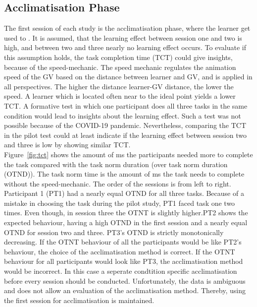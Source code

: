 \subsection{Acclimatisation Phase}
The first session of each study is the acclimatisation phase, where the learner get used to \exgo. It is assumed, that the learning effect between session one and two is high, and between two and three nearly no learning effect occurs. To evaluate if this assumption holds, the task completion time (TCT) could give insights, because of the speed-mechanic. The speed mechanic regulates the animation speed of the GV based on the distance between learner and GV, and is applied in all perspectives. The higher the distance learner-GV distance, the lower the speed. A learner which is located  often near to the ideal point yields a lower TCT. A formative test in which one participant does all three tasks in the same condition would lead to insights about the learning effect. Such a test was not possible because of the COVID-19 pandemic. Nevertheless, comparing the TCT in the pilot test could at least indicate if the learning effect between session two and three is low by showing similar TCT.\\
Figure~\ref{fig:tct} shows the amount of ms the participants needed more to complete the task compared with the task norm duration (over task norm duration (OTND)). The task norm time is the amount of ms the task needs to complete without the speed-mechanic. The order of the sessions is from left to right. Participant 1 (PT1) had a nearly equal OTND for all three tasks. Because of a mistake in choosing the task during the pilot study, PT1 faced task one two times. Even though, in session three the OTNT is slightly higher.PT2 shows the expected behaviour, having a high OTND in the first session and a nearly equal OTND for session two and three. PT3's OTND is strictly monotonically decreasing. If the OTNT behaviour of all the participants would be like PT2's behaviour, the choice of the acclimatisation method is correct. If the OTNT behaviour for all participants would look like PT3, the acclimatisation method would be incorrect. In this case a seperate condtition specific acclimatisation before every session should be conducted. Unfortunately, the data is ambiguous and does not allow an evaluation of the acclimatisation method. Thereby, using the first session for acclimatisation is maintained.


